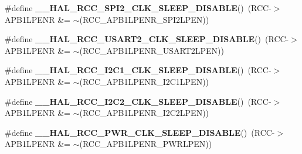\begin{DoxyCompactItemize}
\item 
\#define {\bfseries \+\_\+\+\_\+\+H\+A\+L\+\_\+\+R\+C\+C\+\_\+\+S\+P\+I2\+\_\+\+C\+L\+K\+\_\+\+S\+L\+E\+E\+P\+\_\+\+D\+I\+S\+A\+B\+LE}()~(R\+CC-\/$>$A\+P\+B1\+L\+P\+E\+NR \&= $\sim$(R\+C\+C\+\_\+\+A\+P\+B1\+L\+P\+E\+N\+R\+\_\+\+S\+P\+I2\+L\+P\+EN))\hypertarget{group___r_c_c___a_p_b1___low_power___enable___disable_ga4fff9b3416d2940cac20962e6d5655ec}{}\label{group___r_c_c___a_p_b1___low_power___enable___disable_ga4fff9b3416d2940cac20962e6d5655ec}

\item 
\#define {\bfseries \+\_\+\+\_\+\+H\+A\+L\+\_\+\+R\+C\+C\+\_\+\+U\+S\+A\+R\+T2\+\_\+\+C\+L\+K\+\_\+\+S\+L\+E\+E\+P\+\_\+\+D\+I\+S\+A\+B\+LE}()~(R\+CC-\/$>$A\+P\+B1\+L\+P\+E\+NR \&= $\sim$(R\+C\+C\+\_\+\+A\+P\+B1\+L\+P\+E\+N\+R\+\_\+\+U\+S\+A\+R\+T2\+L\+P\+EN))\hypertarget{group___r_c_c___a_p_b1___low_power___enable___disable_ga3ad038000c76cee2e7ca00d56ba64c17}{}\label{group___r_c_c___a_p_b1___low_power___enable___disable_ga3ad038000c76cee2e7ca00d56ba64c17}

\item 
\#define {\bfseries \+\_\+\+\_\+\+H\+A\+L\+\_\+\+R\+C\+C\+\_\+\+I2\+C1\+\_\+\+C\+L\+K\+\_\+\+S\+L\+E\+E\+P\+\_\+\+D\+I\+S\+A\+B\+LE}()~(R\+CC-\/$>$A\+P\+B1\+L\+P\+E\+NR \&= $\sim$(R\+C\+C\+\_\+\+A\+P\+B1\+L\+P\+E\+N\+R\+\_\+\+I2\+C1\+L\+P\+EN))\hypertarget{group___r_c_c___a_p_b1___low_power___enable___disable_gac7dc1c5239cd70bee94eefa3d91cdd7a}{}\label{group___r_c_c___a_p_b1___low_power___enable___disable_gac7dc1c5239cd70bee94eefa3d91cdd7a}

\item 
\#define {\bfseries \+\_\+\+\_\+\+H\+A\+L\+\_\+\+R\+C\+C\+\_\+\+I2\+C2\+\_\+\+C\+L\+K\+\_\+\+S\+L\+E\+E\+P\+\_\+\+D\+I\+S\+A\+B\+LE}()~(R\+CC-\/$>$A\+P\+B1\+L\+P\+E\+NR \&= $\sim$(R\+C\+C\+\_\+\+A\+P\+B1\+L\+P\+E\+N\+R\+\_\+\+I2\+C2\+L\+P\+EN))\hypertarget{group___r_c_c___a_p_b1___low_power___enable___disable_ga46fe2d4331320cfe49b751b5488fc0cd}{}\label{group___r_c_c___a_p_b1___low_power___enable___disable_ga46fe2d4331320cfe49b751b5488fc0cd}

\item 
\#define {\bfseries \+\_\+\+\_\+\+H\+A\+L\+\_\+\+R\+C\+C\+\_\+\+P\+W\+R\+\_\+\+C\+L\+K\+\_\+\+S\+L\+E\+E\+P\+\_\+\+D\+I\+S\+A\+B\+LE}()~(R\+CC-\/$>$A\+P\+B1\+L\+P\+E\+NR \&= $\sim$(R\+C\+C\+\_\+\+A\+P\+B1\+L\+P\+E\+N\+R\+\_\+\+P\+W\+R\+L\+P\+EN))\hypertarget{group___r_c_c___a_p_b1___low_power___enable___disable_ga7b9889044ebfe2c9328d0f6733fda87d}{}\label{group___r_c_c___a_p_b1___low_power___enable___disable_ga7b9889044ebfe2c9328d0f6733fda87d}

\end{DoxyCompactItemize}


